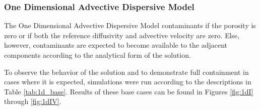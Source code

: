 \subsubsection{One Dimensional Advective Dispersive Model}
The One Dimensional Advective Dispersive Model contaminants if the porosity is 
zero or if both the reference diffusivity and advective velocity are zero. 
Else, however, contaminants are expected to  become available to the adjacent 
components according to the analytical form of the solution.

To observe the behavior of the solution and to demonstrate full containment in 
cases where it is expected, simulations were run according to the descriptions 
in Table \ref{tab:1d_base}.  Results of these base cases can be found in 
Figures \ref{fig:1dI} through \ref{fig:1dIV}.  

%

\FloatBarrier
